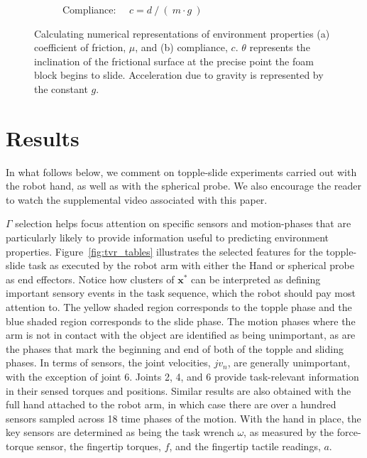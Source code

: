 \begin{figure}[]
\begin{subfigure}[]{0.490\linewidth}
        \caption{Compliance: ~~$c = d~/~(~m \cdot g~)$}
        \label{fig:compliance}
    \end{subfigure}
    \caption{Calculating numerical representations of environment properties (a) coefficient of friction, $\mu$, and (b) compliance, $c$. $\theta$ represents the inclination of the frictional surface at the precise point the foam block begins to slide. Acceleration due to gravity is represented by the constant $g$.}
    \label{fig:property_calc}
\end{figure}

\section{Results}
In what follows below, we comment on topple-slide experiments carried out with the robot hand, as well as with the spherical probe.
We also encourage the reader to watch the supplemental video associated with this paper.


$\Gamma$ selection helps focus attention on specific sensors and motion-phases that are particularly likely to provide information useful to predicting environment properties.
Figure~\ref{fig:tvr_tables} illustrates the selected features for the topple-slide task as executed by the robot arm with either the Hand or spherical probe as end effectors.
Notice how clusters of $\mathbf{x}^*$ can be interpreted as defining important sensory events in the task sequence, which the robot should pay most attention to.
The yellow shaded region corresponds to the topple phase and the blue shaded region corresponds to the slide phase.
The motion phases where the arm is not in contact with the object are identified as being unimportant, as are the phases that mark the beginning and end of both of the topple and sliding phases.
In terms of sensors, the joint velocities, $jv_n$, are generally unimportant, with the exception of joint 6. 
Joints 2, 4, and 6 provide task-relevant information in their sensed torques and positions.
Similar results are also obtained with the full hand attached to the robot arm, in which case there are over a hundred sensors sampled across 18 time phases of the motion.
With the hand in place, the key sensors are determined as being the task wrench $\omega$, as measured by the force-torque sensor, the fingertip torques, $f$, and the fingertip tactile readings, $a$.

